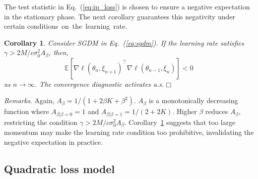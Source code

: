 \documentclass[conference]{IEEEtran}
\newtheorem{corollary}[theorem]{Corollary}
\begin{document}
The test statistic in Eq.~(\ref{eq:ip_loss}) is chosen to ensure a negative expectation in the stationary phase. 
The next corollary guarantees this negativity under certain conditions~on~the~learning~rate.
\begin{corollary}
\label{cor:ip_exp_neg}
Consider SGDM in Eq.~(\ref{eq:sgdm}). If
the learning rate satisfies $\gamma > 2 M / c \sigma_0^2 A_\beta$, then, 
\begin{equation*}
\mathbb{E} [ \nabla \ell ( \theta_n, \xi_{n+1} )^\top \nabla \ell ( \theta_{n-1}, \xi_n ) ] 
< 0
\end{equation*}
as $n \rightarrow \infty$.
The convergence diagnostic activates a.s.\hfill$\Box$
\end{corollary}
\emph{Remarks.}
Again, $A_\beta =  1 / (1 + 2 \beta K + \beta^2)$.
$A_\beta$ is a monotonically decreasing function where $A_{\beta | \beta=0} = 1$ and $A_{\beta | \beta=1} = 1 / (2 + 2K)$.
Higher $\beta$ reduces $A_\beta$, restricting the condition $\gamma > 2M / c \sigma_0^2 A_\beta$.
Corollary~\ref{cor:ip_exp_neg} suggests that too large momentum may make the learning rate condition too prohibitive, invalidating the negative expectation in practice.


\subsection{Quadratic loss model}\label{sec:quadratic}
\end{document}

